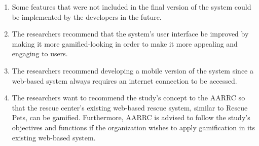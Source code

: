 \begin{enumerate}
	\item Some features that were not included in the final version of the system could be implemented by the developers in the future.
	
	\item The researchers recommend that the system's user interface be improved by making it more gamified-looking in order to make it more appealing and engaging to users.
	
	\item The researchers recommend developing a mobile version of the system since a web-based system always requires an internet connection to be accessed. 
	
	\item The researchers want to recommend the study's concept to the AARRC so that the rescue center's existing web-based rescue system, similar to Rescue Pets, can be gamified. Furthermore, AARRC is advised to follow the study's objectives and functions if the organization wishes to apply gamification in its existing web-based system.
	
\end{enumerate}








